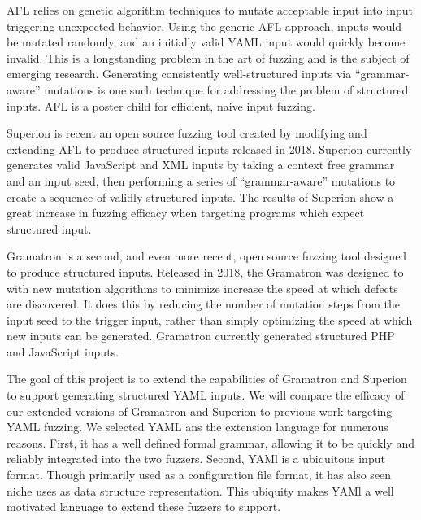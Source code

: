 \documentclass[12pt]{diazessay}
\begin{document}
AFL\cite{AFL_page} relies on genetic algorithm techniques\cite{InputMutationAlgorithm} to mutate acceptable input into input triggering unexpected behavior. Using the generic AFL approach, inputs would be mutated randomly, and an initially valid YAML input would quickly become invalid.
This is a longstanding problem in the art of fuzzing and is the subject of emerging research.
Generating consistently well-structured inputs\cite{structuredInput} via ``grammar-aware'' mutations is one such technique for addressing the problem of structured inputs.
AFL is a poster child for efficient, naive input fuzzing.

Superion\cite{superion} is recent an open source fuzzing tool created by modifying and extending AFL to produce structured inputs released in 2018.
Superion currently generates valid JavaScript and XML inputs by taking a context free grammar and an input seed, then performing a series of ``grammar-aware'' mutations to create a sequence of validly structured inputs.
The results of Superion show a great increase in fuzzing efficacy when targeting programs which expect structured input.

Gramatron\cite{srivastava2021gramatron} is a second, and even more recent, open source fuzzing tool designed to produce structured inputs.
Released in 2018, the Gramatron was designed to with new mutation algorithms to minimize increase the speed at which defects are discovered.
It does this by reducing the number of mutation steps from the input seed to the trigger input, rather than simply optimizing the speed at which new inputs can be generated.
Gramatron currently generated structured PHP and JavaScript inputs.

The goal of this project is to extend the capabilities of Gramatron and Superion to support generating structured YAML inputs.
We will compare the efficacy of our extended versions of Gramatron and Superion to previous work targeting YAML fuzzing.
We selected YAML ans the extension language for numerous reasons.
First, it has a well defined formal grammar, allowing it to be quickly and reliably integrated into the two fuzzers.
Second, YAMl is a ubiquitous input format.
Though primarily used as a configuration file format, it has also seen niche uses as data structure representation.
This ubiquity makes YAMl a well motivated language to extend these fuzzers to support.

\end{document}
